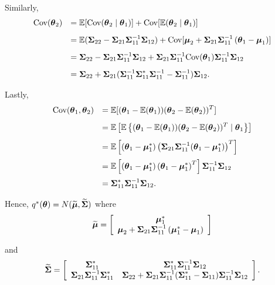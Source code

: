 \documentclass[12pt]{article}
\begin{document}
\begin{enumerate}
    \noindent Similarly,
    $$
    \begin{array}{rl}
    \mbox{Cov}(\vtheta_2) 
    & \ds = \bE[\mbox{Cov}(\vtheta_2\mid\vtheta_1)] + \mbox{Cov}[\bE(\vtheta_2\mid\vtheta_1)] 
    \\ [2ex]
    & \ds = \bE(\mSigma_{22} - \mSigma_{21} \mSigma_{11}^{-1}\mSigma_{12}) + \mbox{Cov}[\vmu_2 + \mSigma_{21}\mSigma_{11}^{-1}\left(\vtheta_1 - \vmu_1\right)] 
    \\ [2ex]
    & \ds = \mSigma_{22} - \mSigma_{21} \mSigma_{11}^{-1}\mSigma_{12}
    + \mSigma_{21}\mSigma_{11}^{-1}  \mbox{Cov}(\vtheta_1) \mSigma_{11}^{-1}  \mSigma_{12}
    \\ [2ex]
    & \ds =  \mSigma_{22} 
    + \mSigma_{21}(\mSigma_{11}^{-1}  \mSigma_{11}^* \mSigma_{11}^{-1} -\mSigma_{11}^{-1})  \mSigma_{12}.
    \end{array} 
    $$
    
    \noindent Lastly,
    $$
    \begin{array}{rl}
    \mbox{Cov}(\vtheta_1,\vtheta_2) 
    & \ds = \bE[(\vtheta_1 - \bE(\vtheta_1))(\vtheta_2 - \bE(\vtheta_2))^T] 
    \\ [2ex]
    & \ds = \bE\left[ \bE\left\{ (\vtheta_1 - \bE(\vtheta_1))(\vtheta_2 - \bE(\vtheta_2))^T \mid \vtheta_1 \right\} \right]     \\ [2ex]
    & \ds = \bE\left[ \left(\vtheta_1 - \vmu_1^* \right)\left(  \mSigma_{21}\mSigma_{11}^{-1}(\vtheta_1 - \vmu_1^*)    \right)^T\right] 
    \\ [2ex]
    & \ds = \bE\left[ \left(\vtheta_1 - \vmu_1^* \right)\left(  \vtheta_1 - \vmu_1^* \right)^T\right] \mSigma_{11}^{-1}\mSigma_{12}
    \\ [2ex]
    & \ds = \mSigma_{11}^* \mSigma_{11}^{-1}\mSigma_{12}.
    \end{array} 
    $$
    
    \noindent Hence, $q^*(\vtheta) = N(\widetilde{\vmu},\widetilde{\mSigma})$ where
    $$
    \widetilde{\vmu} =
    \left[ \begin{array}{c}
    \vmu_1^* \\
     \vmu_2 + \mSigma_{21}\mSigma_{11}^{-1}\left(\vmu_1^* - \vmu_1\right)
    \end{array} \right]
    $$
    
    \noindent and
    $$
    \widetilde{\mSigma} = 
    \left[ \begin{array}{cc}
    \mSigma_{11}^* & \mSigma_{11}^* \mSigma_{11}^{-1}\mSigma_{12} \\
    \mSigma_{21}  \mSigma_{11}^{-1}\mSigma_{11}^* & \mSigma_{22} 
    + \mSigma_{21}\mSigma_{11}^{-1}  ( \mSigma_{11}^* -\mSigma_{11})  \mSigma_{11}^{-1} \mSigma_{12}
    \end{array} \right].
    $$
    

\end{enumerate}
\end{document}
